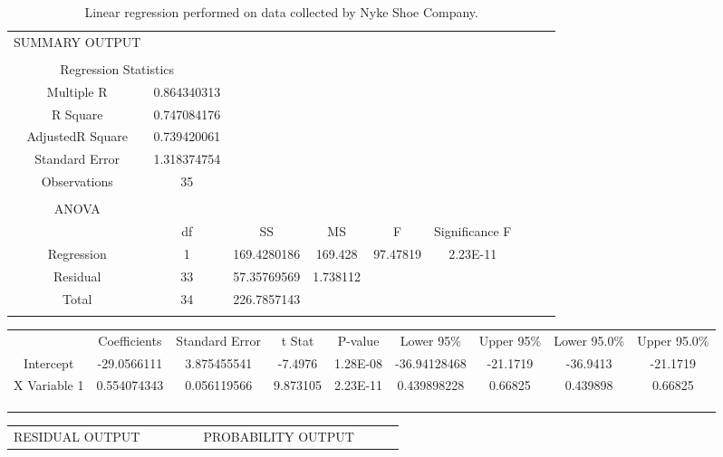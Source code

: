 \begin{center}
{\small
    \begin{longtable}{ccccccccc}
    \caption{\label{tab:LinearRegression}Linear regression performed on data collected by Nyke Shoe Company.}\\
    SUMMARY OUTPUT & & & & & & & & \\
    & & & & & & & & \\
    \multicolumn{2}{c}{ Regression Statistics } & & & & & & & \\
    Multiple R & 0.864340313 & & & & & & & \\
    R Square & 0.747084176 & & & & & & & \\
    AdjustedR Square & 0.739420061 & & & & & & & \\
    Standard Error & 1.318374754 & & & & & & & \\
    Observations & 35 & & & & & & & \\
    & & & & & & & & \\
    ANOVA & & & & & & & & \\
    & df & SS & MS & F & Significance F & & & \\
    Regression & 1 & 169.4280186 & 169.428 & 97.47819 & 2.23E-11 & & & \\
    Residual & 33 & 57.35769569 & 1.738112 & & & & & \\
    Total & 34 & 226.7857143 & & & & & & \\
    & & & & & & & & \\
    \end{longtable}
}
\vspace{-3em}
{
\tiny
\begin{longtable}{ccccccccc}
    & Coefficients & Standard Error & t Stat & P-value & Lower 95\% & Upper 95\% & Lower 95.0\% & Upper 95.0\% \\
    Intercept & -29.0566111 & 3.875455541 & -7.4976 & 1.28E-08 & -36.94128468 & -21.1719 & -36.9413 & -21.1719 \\
    X Variable 1 & 0.554074343 & 0.056119566 & 9.873105 & 2.23E-11 & 0.439898228 & 0.66825 & 0.439898 & 0.66825 \\
    & & & & & & & & \\
    & & & & & & & & \\
    & & & & & & & & \\
    \end{longtable}
}
\vspace{-3em}
{\tiny
    \begin{longtable}{ccccccccc}
RESIDUAL OUTPUT & & & & & PROBABILITY OUTPUT & & & \\

\end{longtable}}
\end{center}
